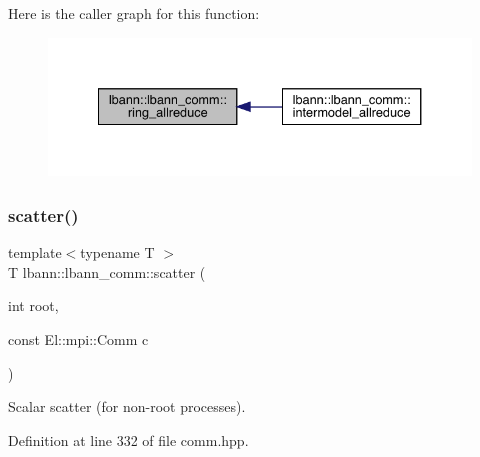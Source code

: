 Here is the caller graph for this function\+:\nopagebreak
\begin{figure}[H]
\begin{center}
\leavevmode
\includegraphics[width=334pt]{classlbann_1_1lbann__comm_a88162511dc2733dccd9c245e6c7ba53b_icgraph}
\end{center}
\end{figure}
\mbox{\label{classlbann_1_1lbann__comm_a74b5c594bfa5aec03af9ad2bd8f5e979}} 
\subsubsection{\texorpdfstring{scatter()}{scatter()}\hspace{0.1cm}{\footnotesize\ttfamily [1/2]}}
{\footnotesize\ttfamily template$<$typename T $>$ \\
T lbann\+::lbann\+\_\+comm\+::scatter (\begin{DoxyParamCaption}\item[{int}]{root,  }\item[{const El\+::mpi\+::\+Comm}]{c }\end{DoxyParamCaption})\hspace{0.3cm}{\ttfamily [inline]}}

Scalar scatter (for non-\/root processes). 

Definition at line 332 of file comm.\+hpp.



